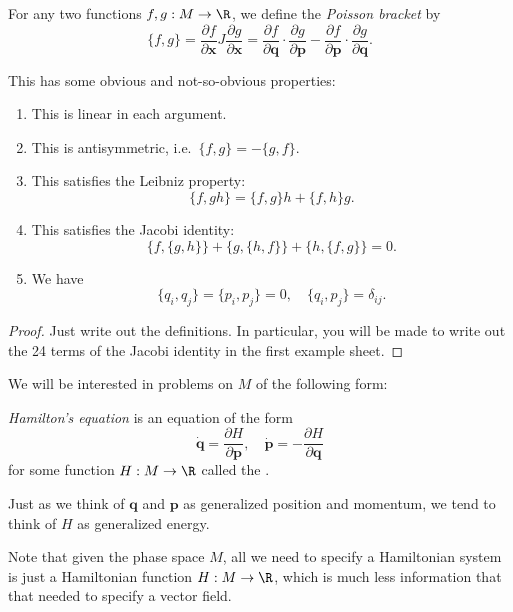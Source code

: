 \documentclass[a4paper]{article}
\begin{document}
\begin{defi}
  For any two functions $f, g: M \to \R$, we define the \emph{Poisson bracket} by
  \[
    \{f, g\} = \frac{\partial f}{\partial \mathbf{x}} J \frac{\partial g}{\partial \mathbf{x}} = \frac{\partial f}{\partial \mathbf{q}} \cdot \frac{\partial g}{\partial \mathbf{p}} - \frac{\partial f}{\partial \mathbf{p}} \cdot \frac{\partial g}{\partial \mathbf{q}}.
  \]
\end{defi}

This has some obvious and not-so-obvious properties:
\begin{prop}\leavevmode
  \begin{enumerate}
    \item This is linear in each argument.
    \item This is antisymmetric, i.e.\ $\{f, g\} = - \{g, f\}$.
    \item This satisfies the Leibniz property:
      \[
        \{f, gh\} = \{f, g\}h + \{f, h\} g.
      \]
    \item This satisfies the Jacobi identity:
      \[
        \{f, \{g, h\}\} + \{g, \{h, f\}\} + \{h, \{f, g\}\} = 0.
      \]
    \item We have
      \[
        \{q_i, q_j\} = \{p_i, p_j\} = 0,\quad \{q_i, p_j\} = \delta_{ij}.
      \]
  \end{enumerate}
\end{prop}

\begin{proof}
  Just write out the definitions. In particular, you will be made to write out the 24 terms of the Jacobi identity in the first example sheet.
\end{proof}

We will be interested in problems on $M$ of the following form:
\begin{defi}
  \emph{Hamilton's equation} is an equation of the form
  \[
    \dot{\mathbf{q}} = \frac{\partial H}{\partial \mathbf{p}},\quad \dot{\mathbf{p}} = -\frac{\partial H}{\partial \mathbf{q}}\tag{$*$}
  \]
  for some function $H: M \to \R$ called the .
\end{defi}
Just as we think of $\mathbf{q}$ and $\mathbf{p}$ as generalized position and momentum, we tend to think of $H$ as generalized energy.

Note that given the phase space $M$, all we need to specify a Hamiltonian system is just a Hamiltonian function $H: M \to \R$, which is much less information that that needed to specify a vector field.
\end{document}
